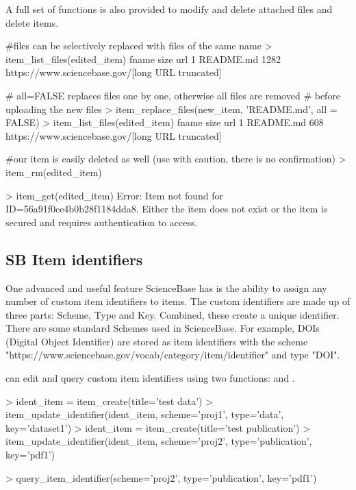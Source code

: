 A full set of functions is also provided to modify and delete attached 
files and delete items. 

\begin{example}
#files can be selectively replaced with files of the same name
> item_list_files(edited_item)
      fname size     url
1 README.md 1282     https://www.sciencebase.gov/[long URL truncated]

# all=FALSE replaces files one by one, otherwise all files are removed
# before uploading the new files
> item_replace_files(new_item, 'README.md', all = FALSE)
> item_list_files(edited_item)
      fname size     url
1 README.md 608     https://www.sciencebase.gov/[long URL truncated]

#our item is easily deleted as well (use with caution, there is no confirmation)
> item_rm(edited_item)

> item_get(edited_item)
Error: Item not found for ID=56a91f0ce4b0b28f1184dda8. Either the item does 
not exist or the item is secured and requires authentication to access.
\end{example}


\subsection{SB Item identifiers}
One advanced and useful feature ScienceBase has is the ability to assign any 
number of custom item identifiers to items. The custom identifiers are made up 
of three parts: Scheme, Type and Key. Combined, these create a unique identifier. 
There are some standard Schemes used in ScienceBase. For example, DOIs (Digital 
Object Identifier) are stored as item identifiers with the scheme 
"https://www.sciencebase.gov/vocab/category/item/identifier" and type "DOI". 

 can edit and query custom item identifiers using two functions:
 and . 

\begin{example}
> ident_item = item_create(title='test data')
> item_update_identifier(ident_item, scheme='proj1', type='data', key='dataset1')
> ident_item = item_create(title='test publication')
> item_update_identifier(ident_item, scheme='proj2', type='publication', key='pdf1')

> query_item_identifier(scheme='proj2', type='publication', key='pdf1')

\end{example}

